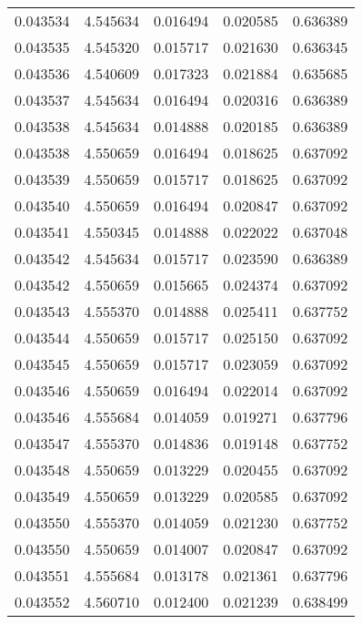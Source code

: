 \begin{tabular}{lrrrr}
0.043534    &  4.545634 &  0.016494 &  0.020585 &             0.636389 \\
0.043535    &  4.545320 &  0.015717 &  0.021630 &             0.636345 \\
0.043536    &  4.540609 &  0.017323 &  0.021884 &             0.635685 \\
0.043537    &  4.545634 &  0.016494 &  0.020316 &             0.636389 \\
0.043538    &  4.545634 &  0.014888 &  0.020185 &             0.636389 \\
0.043538    &  4.550659 &  0.016494 &  0.018625 &             0.637092 \\
0.043539    &  4.550659 &  0.015717 &  0.018625 &             0.637092 \\
0.043540    &  4.550659 &  0.016494 &  0.020847 &             0.637092 \\
0.043541    &  4.550345 &  0.014888 &  0.022022 &             0.637048 \\
0.043542    &  4.545634 &  0.015717 &  0.023590 &             0.636389 \\
0.043542    &  4.550659 &  0.015665 &  0.024374 &             0.637092 \\
0.043543    &  4.555370 &  0.014888 &  0.025411 &             0.637752 \\
0.043544    &  4.550659 &  0.015717 &  0.025150 &             0.637092 \\
0.043545    &  4.550659 &  0.015717 &  0.023059 &             0.637092 \\
0.043546    &  4.550659 &  0.016494 &  0.022014 &             0.637092 \\
0.043546    &  4.555684 &  0.014059 &  0.019271 &             0.637796 \\
0.043547    &  4.555370 &  0.014836 &  0.019148 &             0.637752 \\
0.043548    &  4.550659 &  0.013229 &  0.020455 &             0.637092 \\
0.043549    &  4.550659 &  0.013229 &  0.020585 &             0.637092 \\
0.043550    &  4.555370 &  0.014059 &  0.021230 &             0.637752 \\
0.043550    &  4.550659 &  0.014007 &  0.020847 &             0.637092 \\
0.043551    &  4.555684 &  0.013178 &  0.021361 &             0.637796 \\
0.043552    &  4.560710 &  0.012400 &  0.021239 &             0.638499 \\

\end{tabular}
